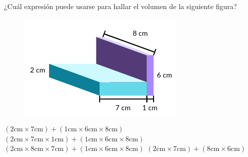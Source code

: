 \question[10] ¿Cuál expresión puede usarse para hallar el volumen de la siguiente figura?

\begin{minipage}{0.45\textwidth}
    \begin{figure}[H]
        \includegraphics[width=0.9\linewidth]{../images/20230316195816}
        \caption{}
        \label{fig:20230316195816}
    \end{figure}
\end{minipage}
\begin{minipage}{0.45\linewidth}
    \begin{choices}
        \choice $(2 \text{cm} \times 7 \text{cm})+(1 \text{cm} \times 6 \text{cm} \times 8 \text{cm})$
        \choice $(2 \text{cm} \times 7 \text{cm} \times 1 \text{cm})+(1 \text{cm} \times 6 \text{cm} \times 8 \text{cm})$
        \CorrectChoice $(2 \text{cm} \times 8 \text{cm} \times 7 \text{cm})+(1 \text{cm} \times 6 \text{cm} \times 8 \text{cm})$
        \choice $(2 \text{cm} \times 7 \text{cm})+(8 \text{cm} \times 6 \text{cm})$
    \end{choices}
\end{minipage}
